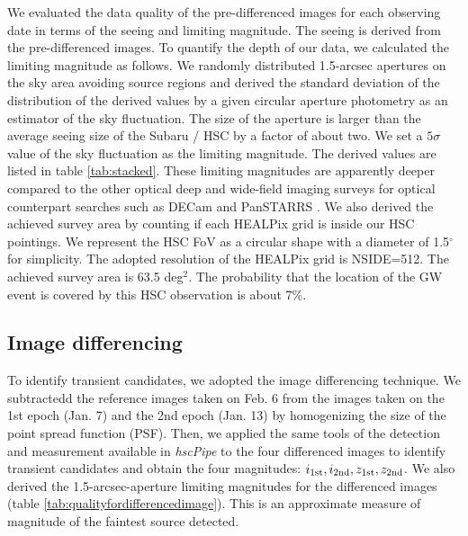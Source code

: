 \documentclass[]{pasj01}
\begin{document}
We evaluated the data quality of the pre-differenced images for each observing date in terms 
of the seeing and limiting magnitude.
The seeing is derived from the pre-differenced images.
To quantify the depth of our data, we calculated the limiting magnitude as follows.
We randomly distributed 1.5-arcsec apertures on the sky area  avoiding source regions
and derived the standard deviation of the distribution of the derived values
by a given circular aperture photometry as an estimator of the sky fluctuation.
The size of the aperture is larger than the average seeing size of the Subaru / HSC by a factor of about two.
We set a $5\sigma$ value of the sky fluctuation as the limiting magnitude.
The derived values are listed in table \ref{tab:stacked}.
These limiting magnitudes are apparently deeper compared to the other optical deep and wide-field imaging surveys
for optical counterpart searches such as DECam \citep{2016ApJ...826L..29C} and PanSTARRS \citep{2016ApJ...827L..40S}.
We also derived the achieved survey area by counting if each HEALPix grid is inside our HSC pointings.
We represent the HSC FoV as a circular shape with a diameter of 1.5$^\circ$ for simplicity.
The adopted resolution of the HEALPix grid is NSIDE=512. The achieved survey area is 63.5 deg$^2$.
The probability that the location of the GW event is covered by this HSC observation is about 7\%.


\subsection{Image differencing}

\begin{table*}[htdp]
\label{tab:qualityfordifferencedimage}
\begin{tabnote}
\end{tabnote}
\end{table*}%

To identify transient candidates, we adopted the image differencing technique.
We subtractedd the reference images taken on Feb. 6 from the images taken on the 1st epoch (Jan. 7) and the 2nd epoch (Jan. 13) by homogenizing the size of the point spread function (PSF).
Then, we applied the same tools of the detection and measurement available
in \emph{hscPipe} to the four differenced images to identify transient candidates and obtain the four magnitudes: $i_{\rm 1st},i_{\rm 2nd},z_{\rm 1st},z_{\rm 2nd}$.
We also derived the 1.5-arcsec-aperture limiting magnitudes for the differenced images (table \ref{tab:qualityfordifferencedimage}).
 This is an approximate measure of magnitude of the faintest source detected.
\end{document}
